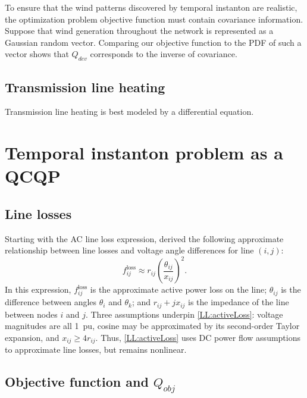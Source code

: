 \documentclass[conference]{IEEEtran}
\begin{document}
To ensure that the wind patterns discovered by temporal instanton are realistic, the optimization problem objective function must contain covariance information. Suppose that wind generation throughout the network is represented as a Gaussian random vector. Comparing our objective function to the PDF of such a vector shows that $Q_{dev}$ corresponds to the inverse of covariance.

\subsection{Transmission line heating}\label{sec:line-heating}

Transmission line heating is best modeled by a differential equation.

\section{Temporal instanton problem as a QCQP}\label{sec:qcqp}

\subsection{Line losses}\label{sec:line-losses}

Starting with the AC line loss expression, \cite{almassalkhi2014}
derived the following approximate relationship between line losses and
voltage angle differences for line $(i,j)$:
\begin{equation}
\label{LL:activeLoss}
f_{ij}^{\text{loss}} \approx r_{ij}\left(\frac{\theta_{ij}}{x_{ij}}\right)^2.
\end{equation}
In this expression, $f_{ij}^{\text{loss}}$ is the approximate active
power loss on the line; $\theta_{ij}$ is the difference between angles
$\theta_i$ and $\theta_k$; and $r_{ij} +j x_{ij}$ is the impedance of
the line between nodes $i$ and $j$. Three assumptions underpin
\eqref{LL:activeLoss}: voltage magnitudes are all 1~pu, cosine may be
approximated by its second-order Taylor expansion, and $x_{ij} \geq
4r_{ij}$. Thus, \eqref{LL:activeLoss} uses DC power flow assumptions
to approximate line losses, but remains nonlinear.

\subsection{Objective function and $Q_{obj}$}\label{sec:Qobj}
\end{document}
